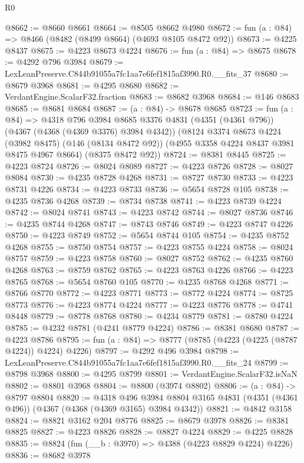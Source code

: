 \begin{lexlean}{R0}
\begin{coremodule}
@8662 := @8660 @8661
@8664 := @8505 @8662 @4980
@8672 := fun (a : @84) => @8466 (@8482 (@8499 @8664) (@4693 @8105 @8472 @92))
@8673 := @4225 @8437
@8675 := @4223 @8673 @4224
@8676 := fun (a : @84) => @8675
@8678 := @4292 @796 @3984
@8679 := LexLeanPreserve.C844b91055a7fc1aa7e6fef1815af3990.R0.__fits_37
@8680 := @8679 @3968
@8681 := @4295 @8680
@8682 := VerdantEngine.ScalarF32.fraction
@8683 := @8682 @3968
@8684 := @146 @8683
@8685 := @8681 @8684
@8687 := (a : @84) -> @8678 @8685
@8723 := fun (a : @84) =>
  @4318
    @796
    @3984
    @8685
    @3376
    @4831
    (@4351 (@4361 @796))
    (@4367 (@4368 (@4369 @3376) @3984 @4342))
    (@8124
      @3374
      @8673
      @4224
      (@3982 @8475)
      (@146 (@8134 @8472 @92))
      (@4955 @3358 @4224 @8437 @3981 @8475 @4967 @8664)
      (@8375 @8472 @92))
@8724 := @8381 @8445
@8725 := @4223 @8724
@8726 := @8024 @8089
@8727 := @4223 @8726
@8728 := @8027 @8084
@8730 := @4235 @8728 @4268
@8731 := @8727 @8730
@8733 := @4223 @8731 @4226
@8734 := @4223 @8733
@8736 := @5654 @8728 @105
@8738 := @4235 @8736 @4268
@8739 := @8734 @8738
@8741 := @4223 @8739 @4224
@8742 := @8024 @8741
@8743 := @4223 @8742
@8744 := @8027 @8736
@8746 := @4235 @8744 @4268
@8747 := @8743 @8746
@8749 := @4223 @8747 @4226
@8750 := @4223 @8749
@8752 := @5654 @8744 @105
@8754 := @4235 @8752 @4268
@8755 := @8750 @8754
@8757 := @4223 @8755 @4224
@8758 := @8024 @8757
@8759 := @4223 @8758
@8760 := @8027 @8752
@8762 := @4235 @8760 @4268
@8763 := @8759 @8762
@8765 := @4223 @8763 @4226
@8766 := @4223 @8765
@8768 := @5654 @8760 @105
@8770 := @4235 @8768 @4268
@8771 := @8766 @8770
@8772 := @4223 @8771
@8773 := @8772 @4224
@8774 := @8725 @8773
@8776 := @4223 @8774 @4224
@8777 := @4223 @8776
@8778 := @4741 @8448
@8779 := @8778 @8768
@8780 := @4234 @8779
@8781 := @8780 @4224
@8785 := @4232 @8781 (@4241 @8779 @4224)
@8786 := @8381 @8680
@8787 := @4223 @8786
@8795 := fun (a : @84) => @8777 (@8785 (@4223 (@4225 (@8787 @4224)) @4224) @4226)
@8797 := @4292 @496 @3984
@8798 := LexLeanPreserve.C844b91055a7fc1aa7e6fef1815af3990.R0.__fits_24
@8799 := @8798 @3968
@8800 := @4295 @8799
@8801 := VerdantEngine.ScalarF32.isNaN
@8802 := @8801 @3968
@8804 := @8800 (@3974 @8802)
@8806 := (a : @84) -> @8797 @8804
@8820 := @4318
    @496
    @3984
    @8804
    @3165
    @4831
    (@4351 (@4361 @496))
    (@4367 (@4368 (@4369 @3165) @3984 @4342))
@8821 := @4842 @3158
@8824 := @8821 @3162 @204 @8776
@8825 := @8679 @3978
@8826 := @8381 @8825
@8827 := @4223 @8826
@8828 := @8827 @4224
@8829 := @4225 @8828
@8835 := @8824 (fun (__b : @3970) => @4388 (@4223 @8829 @4224) @4226)
@8836 := @8682 @3978

\end{coremodule}
\end{lexlean}
